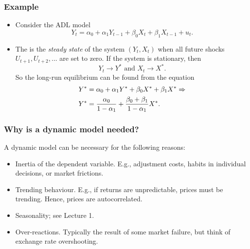 
\begin{frame}
\frametitle{Example}
\begin{itemize}
\item
Consider the ADL model%
\begin{equation}
Y_{t}=\alpha_{0}+\alpha_{1}Y_{t-1}+\beta_{0}X_{t}+\beta_{1}X_{t-1}+u_{t}.
\label{eq: ADL(1,1)}
\end{equation}

\item The  is the \emph{\color{red}steady state} of the system $\left( Y_{t},X_{t}\right) $ when all
future shocks $U_{t+1},U_{t+2},...$ are set to zero. If the system is
stationary, then
\begin{equation*}
Y_{t}\rightarrow Y^{\ast }\text{ \ and \ }X_{t}\rightarrow X^{\ast }.
\end{equation*}%
So the long-run equilibrium can be found from the equation%
\begin{align}
Y^{\ast }& =\alpha _{0}+\alpha _{1}Y^{\ast }+\beta _{0}X^{\ast }+\beta
_{1}X^{\ast }\Rightarrow  \notag \\
Y^{\ast }& =\frac{\alpha _{0}}{1-\alpha _{1}}+\frac{\beta _{0}+\beta _{1}}{%
1-\alpha _{1}}X^{\ast }.  \label{eq: static lr solution}
\end{align}
\end{itemize}
\end{frame}
\begin{frame}
\frametitle{Why is a dynamic model needed?}
A dynamic model can be necessary for the following reasons:
\begin{itemize}
\item Inertia of the dependent variable. E.g., adjustment costs, habits in
individual decisions, or market frictions.

\item Trending behaviour. E.g., if returns are unpredictable, prices must be
trending. Hence, prices are autocorrelated.

\item Seasonality; see Lecture 1.

\item Over-reactions. Typically the result of some market failure, but think
of exchange rate overshooting.
\end{itemize}
\end{frame}

